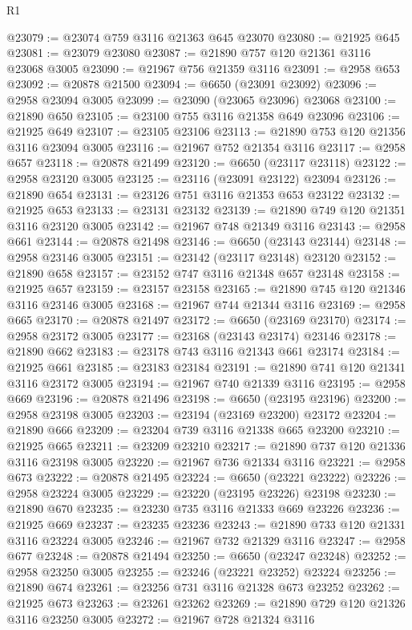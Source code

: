 \begin{lexlean}{R1}
\begin{coremodule}
@23079 := @23074 @759 @3116 @21363 @645 @23070
@23080 := @21925 @645
@23081 := @23079 @23080
@23087 := @21890 @757 @120 @21361 @3116 @23068 @3005
@23090 := @21967 @756 @21359 @3116
@23091 := @2958 @653
@23092 := @20878 @21500
@23094 := @6650 (@23091 @23092)
@23096 := @2958 @23094 @3005
@23099 := @23090 (@23065 @23096) @23068
@23100 := @21890 @650
@23105 := @23100 @755 @3116 @21358 @649 @23096
@23106 := @21925 @649
@23107 := @23105 @23106
@23113 := @21890 @753 @120 @21356 @3116 @23094 @3005
@23116 := @21967 @752 @21354 @3116
@23117 := @2958 @657
@23118 := @20878 @21499
@23120 := @6650 (@23117 @23118)
@23122 := @2958 @23120 @3005
@23125 := @23116 (@23091 @23122) @23094
@23126 := @21890 @654
@23131 := @23126 @751 @3116 @21353 @653 @23122
@23132 := @21925 @653
@23133 := @23131 @23132
@23139 := @21890 @749 @120 @21351 @3116 @23120 @3005
@23142 := @21967 @748 @21349 @3116
@23143 := @2958 @661
@23144 := @20878 @21498
@23146 := @6650 (@23143 @23144)
@23148 := @2958 @23146 @3005
@23151 := @23142 (@23117 @23148) @23120
@23152 := @21890 @658
@23157 := @23152 @747 @3116 @21348 @657 @23148
@23158 := @21925 @657
@23159 := @23157 @23158
@23165 := @21890 @745 @120 @21346 @3116 @23146 @3005
@23168 := @21967 @744 @21344 @3116
@23169 := @2958 @665
@23170 := @20878 @21497
@23172 := @6650 (@23169 @23170)
@23174 := @2958 @23172 @3005
@23177 := @23168 (@23143 @23174) @23146
@23178 := @21890 @662
@23183 := @23178 @743 @3116 @21343 @661 @23174
@23184 := @21925 @661
@23185 := @23183 @23184
@23191 := @21890 @741 @120 @21341 @3116 @23172 @3005
@23194 := @21967 @740 @21339 @3116
@23195 := @2958 @669
@23196 := @20878 @21496
@23198 := @6650 (@23195 @23196)
@23200 := @2958 @23198 @3005
@23203 := @23194 (@23169 @23200) @23172
@23204 := @21890 @666
@23209 := @23204 @739 @3116 @21338 @665 @23200
@23210 := @21925 @665
@23211 := @23209 @23210
@23217 := @21890 @737 @120 @21336 @3116 @23198 @3005
@23220 := @21967 @736 @21334 @3116
@23221 := @2958 @673
@23222 := @20878 @21495
@23224 := @6650 (@23221 @23222)
@23226 := @2958 @23224 @3005
@23229 := @23220 (@23195 @23226) @23198
@23230 := @21890 @670
@23235 := @23230 @735 @3116 @21333 @669 @23226
@23236 := @21925 @669
@23237 := @23235 @23236
@23243 := @21890 @733 @120 @21331 @3116 @23224 @3005
@23246 := @21967 @732 @21329 @3116
@23247 := @2958 @677
@23248 := @20878 @21494
@23250 := @6650 (@23247 @23248)
@23252 := @2958 @23250 @3005
@23255 := @23246 (@23221 @23252) @23224
@23256 := @21890 @674
@23261 := @23256 @731 @3116 @21328 @673 @23252
@23262 := @21925 @673
@23263 := @23261 @23262
@23269 := @21890 @729 @120 @21326 @3116 @23250 @3005
@23272 := @21967 @728 @21324 @3116

\end{coremodule}
\end{lexlean}
